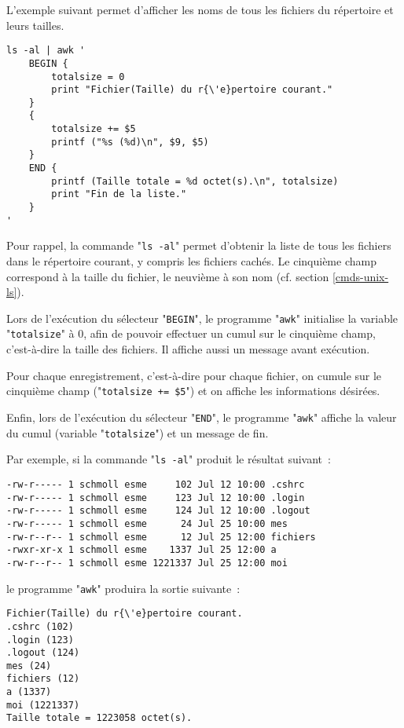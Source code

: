 \begin{example}
L'exemple suivant permet d'afficher les noms de tous les fichiers du r{\'e}pertoire et leurs tailles.
\begin{verbatim}
ls -al | awk '
    BEGIN {
        totalsize = 0
        print "Fichier(Taille) du r{\'e}pertoire courant."
    }
    {
        totalsize += $5
        printf ("%s (%d)\n", $9, $5)
    }
    END {
        printf (Taille totale = %d octet(s).\n", totalsize)
        print "Fin de la liste."
    }
'
\end{verbatim}

Pour rappel, la commande "\texttt{ls -al}" permet d'obtenir la liste de
tous les fichiers dans le r{\'e}pertoire courant, y compris les fichiers
cach{\'e}s. Le cinqui{\`e}me champ correspond {\`a} la taille du fichier, le neuvi{\`e}me
{\`a} son nom (cf. section \ref{cmds-unix-ls}).

Lors de l'ex{\'e}cution du s{\'e}lecteur "\texttt{BEGIN}", le programme
"\texttt{awk}" initialise la variable "\texttt{totalsize}" {\`a} $0$,
afin de pouvoir effectuer un cumul sur le cinqui{\`e}me champ, c'est-{\`a}-dire
la taille des fichiers. Il affiche aussi un message avant ex{\'e}cution.

Pour chaque enregistrement, c'est-{\`a}-dire pour chaque fichier,
on cumule sur le cinqui{\`e}me champ ("\verb,totalsize += $5,")
et on affiche les informations d{\'e}sir{\'e}es.

Enfin, lors de l'ex{\'e}cution du s{\'e}lecteur "\texttt{END}", le
programme "\texttt{awk}" affiche la valeur du cumul (variable
"\texttt{totalsize}") et un message de fin.

Par exemple, si la commande "\texttt{ls -al}" produit le r{\'e}sultat
suivant~:
\begin{verbatim}
-rw-r----- 1 schmoll esme     102 Jul 12 10:00 .cshrc
-rw-r----- 1 schmoll esme     123 Jul 12 10:00 .login
-rw-r----- 1 schmoll esme     124 Jul 12 10:00 .logout
-rw-r----- 1 schmoll esme      24 Jul 25 10:00 mes
-rw-r--r-- 1 schmoll esme      12 Jul 25 12:00 fichiers
-rwxr-xr-x 1 schmoll esme    1337 Jul 25 12:00 a
-rw-r--r-- 1 schmoll esme 1221337 Jul 25 12:00 moi
\end{verbatim}
le programme "\texttt{awk}" produira la sortie suivante~:
\begin{verbatim}
Fichier(Taille) du r{\'e}pertoire courant.
.cshrc (102)
.login (123)
.logout (124)
mes (24)
fichiers (12)
a (1337)
moi (1221337)
Taille totale = 1223058 octet(s).
\end{verbatim}
\end{example}


